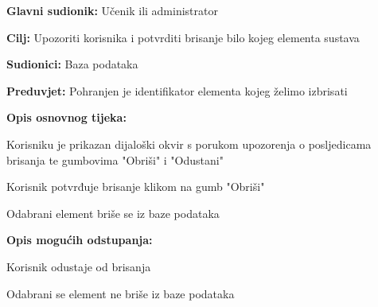 \noindent {}
\begin{packed_item}

	\item \textbf{Glavni sudionik: } Učenik ili administrator
	\item \textbf{Cilj: } Upozoriti korisnika i potvrditi brisanje bilo kojeg elementa sustava
	\item \textbf{Sudionici: } Baza podataka
	\item \textbf{Preduvjet: } Pohranjen je identifikator elementa kojeg želimo izbrisati	
	\item  \textbf{Opis osnovnog tijeka:}
	
	\item[] \begin{packed_enum}

		\item Korisniku je prikazan dijaloški okvir s porukom upozorenja o posljedicama brisanja te gumbovima "Obriši" i "Odustani"
		\item Korisnik potvrđuje brisanje klikom na gumb "Obriši"
		\item Odabrani element briše se iz baze podataka

	\end{packed_enum}

	\item  \textbf{Opis mogućih odstupanja:}
	
	\item[] \begin{packed_item}

		\item[2.a] Korisnik odustaje od brisanja
		\item[] \begin{packed_enum}
			
			\item Odabrani se element ne briše iz baze podataka
			
		\end{packed_enum}
		
	\end{packed_item}
	
\end{packed_item}

